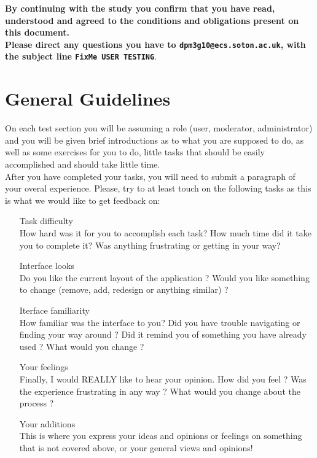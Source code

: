 \documentclass[12pt]{article}
\begin{document}
\textbf{By continuing with the study you confirm that you have read, understood and agreed to the conditions and obligations present on this document.} \\

\textbf{Please direct any questions you have to \texttt{dpm3g10@ecs.soton.ac.uk}, with the subject line \texttt{FixMe USER TESTING}}.
\pagebreak

\section{General Guidelines}
On each test section you will be assuming a role (user, moderator, administrator) and you will be given brief introductions as to what you are supposed to do, as well as some exercises for you to do, little tasks that should be easily accomplished and should take little time. \\

After you have completed your tasks, you will need to submit a paragraph of your overal experience. Please, try to at least touch on the following tasks as this is what we would like to get feedback on:

\begin{itemize}
\item[Task difficulty]\hfill \\How hard was it for you to accomplish each task? How much time did it take you to complete it? Was anything frustrating or getting in your way?\\
\item[Interface looks]\hfill \\ Do you like the current layout of the application ? Would you like something to change (remove, add, redesign or anything similar) ?\\
\item[Iterface familiarity] \hfill \\ How familiar was the interface to you? Did you have trouble navigating or finding your way around ? Did it remind you of something you have already used ? What would you change ?\\
\item[Your feelings] \hfill \\
Finally, I would REALLY like to hear your opinion. How did you feel ? Was the experience frustrating in any way ? What would you change about the process ?
\item[Your additions] \hfill \\
This is where you express your ideas and opinions or feelings on something that is not covered above, or your general views and opinions! 
\end{itemize}
\end{document}
